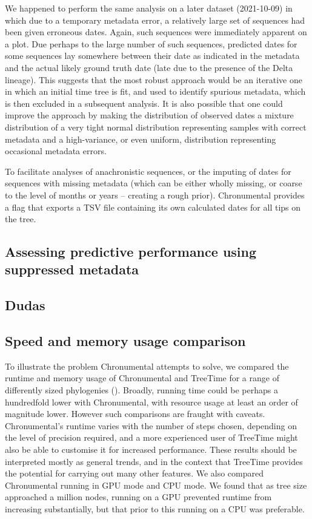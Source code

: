 We happened to perform the same analysis on a later dataset (2021-10-09) in which due to a temporary metadata error, a relatively large set of sequences had been given erroneous dates. Again, such sequences were immediately apparent on a plot. Due perhaps to the large number of such sequences, predicted dates for some sequences lay somewhere between their date as indicated in the metadata and the actual likely ground truth date (late due to the presence of the Delta lineage). This suggests that the most robust approach would be an iterative one in which an initial time tree is fit, and used to identify  spurious metadata, which is then excluded in a subsequent analysis. It is also possible that one could improve the approach by making the distribution of observed dates a mixture distribution of a very tight normal distribution representing samples with correct metadata and a high-variance, or even uniform, distribution representing occasional metadata errors.

To facilitate analyses of anachronistic sequences, or the imputing of dates for sequences with missing metadata (which can be either wholly missing, or coarse to the level of months or years -- creating a rough prior). Chronumental provides a flag that exports a TSV file containing its own calculated dates for all tips on the tree.

\subsection*{Assessing predictive performance using suppressed metadata}




\subsection*{Dudas}


\subsection*{Speed and memory usage comparison}
To illustrate the problem Chronumental attempts to solve, we compared the runtime and memory usage of Chronumental and TreeTime for a range of differently sized phylogenies (). Broadly, running time could be perhaps a hundredfold lower with Chronumental, with resource usage at least an order of magnitude lower. However such comparisons are fraught with caveats. Chronumental's runtime varies with the number of steps chosen, depending on the level of precision required, and a more experienced user of TreeTime might also be able to customise it for increased performance. These results should be interpreted mostly as general trends, and in the context that TreeTime provides the potential for carrying out many other features. We also compared Chronumental running in GPU mode and CPU mode. We found that as tree size approached a million nodes, running on a GPU prevented runtime from increasing substantially, but that prior to this running on a CPU was preferable.




